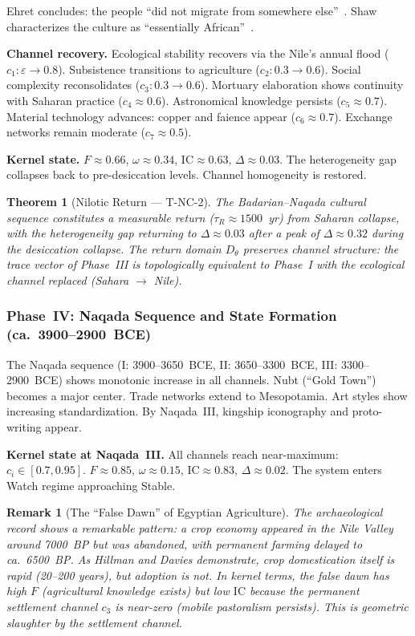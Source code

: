 \documentclass[
  aps,
  prd,
  twocolumn,
  superscriptaddress,
  nofootinbib,
  floatfix
]{revtex4-2}
\newtheorem{theorem}{Theorem}
\newtheorem{remark}{Remark}
\newcommand{\tR}{\tau_{\!R}}
\newcommand{\eps}{\varepsilon}
\newcommand{\IC}{\mathrm{IC}}
\begin{document}
Ehret concludes: the people ``did not migrate from
somewhere else''~\cite{ehret2023ancient}.  Shaw
characterizes the culture as ``essentially
African''~\cite{shaw2003oxford}.

\textbf{Channel recovery.}  Ecological stability
recovers via the Nile's annual flood
($c_1: \eps \to 0.8$).  Subsistence transitions to
agriculture ($c_2: 0.3 \to 0.6$).  Social complexity
reconsolidates ($c_3: 0.3 \to 0.6$).  Mortuary
elaboration shows continuity with Saharan practice
($c_4 \approx 0.6$).  Astronomical knowledge persists
($c_5 \approx 0.7$).  Material technology advances:
copper and faience appear ($c_6 \approx 0.7$).
Exchange networks remain moderate ($c_7 \approx
0.5$).

\textbf{Kernel state.}  $F \approx 0.66$,
$\omega \approx 0.34$, $\IC \approx 0.63$,
$\Delta \approx 0.03$.  The heterogeneity gap
collapses back to pre-desiccation levels.  Channel
homogeneity is restored.

\begin{theorem}[Nilotic Return ---
T-NC-2]\label{thm:return}
The Badarian--Naqada cultural sequence constitutes a
measurable return ($\tR \approx 1500$~yr) from
Saharan collapse, with the heterogeneity gap
returning to $\Delta \approx 0.03$ after a peak of
$\Delta \approx 0.32$ during the desiccation
collapse.  The return domain $D_\theta$ preserves
channel structure: the trace vector of Phase~III is
topologically equivalent to Phase~I with the
ecological channel replaced (Sahara $\to$ Nile).
\end{theorem}


\subsubsection{Phase~IV: Naqada Sequence and State
Formation (ca.\ 3900--2900~BCE)}\label{sec:naqada}

The Naqada sequence (I: 3900--3650~BCE, II:
3650--3300~BCE, III: 3300--2900~BCE) shows monotonic
increase in all channels.  Nubt (``Gold Town'') becomes
a major center.  Trade networks extend to Mesopotamia.
Art styles show increasing standardization.  By
Naqada~III, kingship iconography and proto-writing
appear.

\textbf{Kernel state at Naqada~III.}  All channels
reach near-maximum: $c_i \in [0.7, 0.95]$.
$F \approx 0.85$, $\omega \approx 0.15$,
$\IC \approx 0.83$, $\Delta \approx 0.02$.
The system enters Watch regime approaching Stable.

\begin{remark}[The ``False Dawn'' of Egyptian
Agriculture]\label{rem:falsedawn}
The archaeological record shows a remarkable
pattern: a crop economy appeared in the Nile Valley
around 7000~BP but was \emph{abandoned}, with
permanent farming delayed to ca.\ 6500~BP.  As
Hillman and Davies demonstrate, crop domestication
itself is rapid (20--200 years), but adoption is not.
In kernel terms, the false dawn has high $F$
(agricultural knowledge exists) but low $\IC$
because the permanent settlement channel $c_3$ is
near-zero (mobile pastoralism persists).  This is
geometric slaughter by the settlement channel.
\end{remark}
\end{document}
